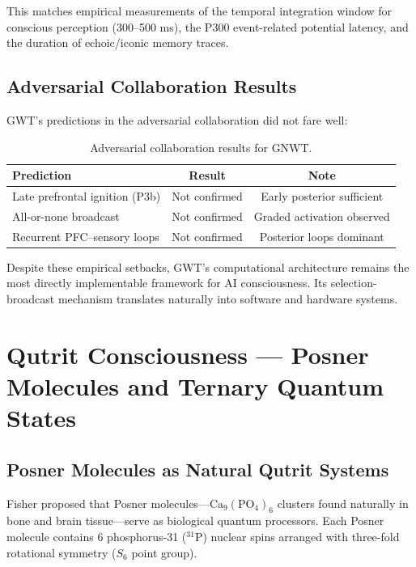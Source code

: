 \documentclass[12pt,a4paper]{article}
\begin{document}
\noindent
This matches empirical measurements of the temporal integration window for
conscious perception (300--500 ms), the P300 event-related potential latency,
and the duration of echoic/iconic memory traces.

\subsection{Adversarial Collaboration Results}

GWT's predictions in the adversarial collaboration \cite{Nature2025Adversarial}
did not fare well:

\begin{table}[h!]
\centering
\caption{Adversarial collaboration results for GNWT.}
\label{tab:gwt_results}
\begin{tabular}{@{}lcc@{}}
\toprule
\textbf{Prediction} & \textbf{Result} & \textbf{Note} \\
\midrule
Late prefrontal ignition (P3b) & Not confirmed & Early posterior sufficient \\
All-or-none broadcast & Not confirmed & Graded activation observed \\
Recurrent PFC--sensory loops & Not confirmed & Posterior loops dominant \\
\bottomrule
\end{tabular}
\end{table}

\noindent
Despite these empirical setbacks, GWT's computational architecture remains
the most directly implementable framework for AI consciousness. Its
selection-broadcast mechanism translates naturally into software and hardware
systems.

\section{Qutrit Consciousness --- Posner Molecules and Ternary Quantum States}
\label{sec:qutrits}

\subsection{Posner Molecules as Natural Qutrit Systems}

Fisher \cite{Fisher2015} proposed that Posner molecules---$\mathrm{Ca}_9(\mathrm{PO}_4)_6$
clusters found naturally in bone and brain tissue---serve as biological quantum
processors. Each Posner molecule contains 6 phosphorus-31 (${}^{31}\mathrm{P}$)
nuclear spins arranged with three-fold rotational symmetry ($S_6$ point group).
\end{document}
